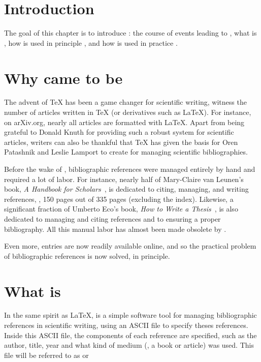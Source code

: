\section{Introduction}
The goal of this chapter is to introduce {\bibtex}: the course of
events leading to {\bibtex} , what
{\bibtex} is , how {\bibtex} is used
in principle , and how {\bibtex} is
used in practice .


\section{Why {\bibtex} came to be}
\label{sec:why_bibtex_came_to_be}

The advent of {\TeX} has been a game changer for scientific writing,
witness the number of articles written in {\TeX} (or derivatives such
as {\LaTeX}).  For instance, on arXiv.org, nearly all articles are
formatted with \LaTeX.  Apart from being grateful to Donald Knuth for
providing such a robust system for scientific articles, writers can
also be thankful that {\TeX} has given the basis for Oren Patashnik
and Leslie Lamport to create {\bibtex} for managing scientific
bibliographies.

Before the wake of {\bibtex}, bibliographic references were managed
entirely by hand and required a lot of labor.  For instance, nearly
half of Mary-Claire van Leunen's book, \textit{A Handbook for
  Scholars}~\cite{leunen1992_handbook}, is dedicated to citing,
managing, and writing references, \ie, 150 pages out of 335 pages
(excluding the index).  Likewise, a significant fraction of Umberto
Eco's book, \textit{How to Write a Thesis}~\cite{eco1985_thesis}, is
also dedicated to managing and citing references and to ensuring a
proper bibliography.  All this manual labor has almost been made
obsolete by {\bibtex}.

Even more, {\bibtex} entries are now readily available online, and so
the practical problem of bibliographic references is now solved, in
principle.

\section{What is {\bibtex}}
\label{sec:principles_of_bibtex}

In the same spirit as {\LaTeX}, {\bibtex} is a simple software tool
for managing bibliographic references in scientific writing, using an
ASCII file to specify theses references.  Inside this ASCII file, the
components of each reference are specified, such as the author, title,
year and what kind of medium (\eg, a book or article) was used.  This
file will be referred to as  or

